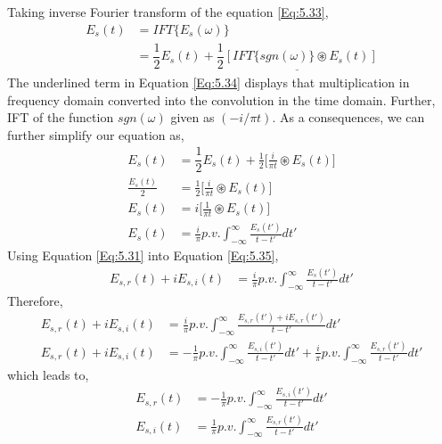 Taking inverse Fourier transform of the equation \ref{Eq:5.33},
\begin{equation}
\begin{split}
{E_s}(t)&=IFT\{E_s(\omega)\}\\
&=\dfrac{1}{2}{E_s}(t)+\underline{\dfrac{1}{2}[IFT\{sgn(\omega)\} \circledast {E_s}(t)]}
\end{split}
\label{Eq:5.34}
\end{equation}
The underlined term in Equation \ref{Eq:5.34} displays that multiplication in frequency domain converted into the convolution in the time domain. Further, IFT of the function $sgn(\omega)$ given as $(-i/\pi t)$. As a consequences, we can further simplify our equation as,
\begin{equation}
\begin{split}
{E_s}(t)&=\dfrac{1}{2}{E_s}(t)+\frac{1}{2}\bigg[\frac{i}{\pi t} \circledast {E_s}(t) \bigg]\\
\frac{{E_s}(t)}{2} &=\frac{1}{2}\bigg[\frac{i}{\pi t} \circledast {E_s}(t) \bigg]\\
{E_s}(t) &=i\bigg[\frac{1}{\pi t} \circledast {E_s}(t) \bigg]\\
{E_s}(t) &=\frac{i}{\pi} p.v. \int_{-\infty}^{\infty} \frac{E_s(t')}{t-t'} dt' 
\end{split}
\label{Eq:5.35}
\end{equation}
Using Equation \ref{Eq:5.31} into Equation \ref{Eq:5.35},
\begin{equation}
\begin{split}
E_{s,r}(t)+iE_{s,i}(t) &=\frac{i}{\pi} p.v. \int_{-\infty}^{\infty} \frac{E_s(t')}{t-t'} dt' 
\end{split}
\label{Eq:5.36}
\end{equation}
Therefore,
\begin{equation}
\begin{split}
E_{s,r}(t)+iE_{s,i}(t) &=\frac{i}{\pi} p.v. \int_{-\infty}^{\infty} \frac{E_{s,r}(t')+iE_{s,r}(t')}{t-t'} dt' \\
E_{s,r}(t)+iE_{s,i}(t)&=-\frac{1}{\pi} p.v. \int_{-\infty}^{\infty} \frac{E_{s,i}(t')}{t-t'} dt' + \frac{i}{\pi} p.v. \int_{-\infty}^{\infty} \frac{E_{s,r}(t')}{t-t'} dt'
\end{split}
\label{Eq:5.37}
\end{equation}
which leads to,
\begin{equation}
\begin{split}
E_{s,r}(t) &=-\frac{1}{\pi} p.v. \int_{-\infty}^{\infty} \frac{E_{s,i}(t')}{t-t'} dt' \\
E_{s,i}(t) &=\frac{1}{\pi} p.v. \int_{-\infty}^{\infty} \frac{E_{s,r}(t')}{t-t'} dt' \\
\end{split}
\label{Eq:5.38}
\end{equation}
